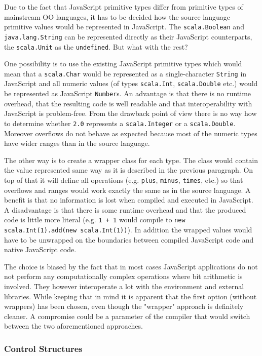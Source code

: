 \documentclass[12pt,a4paper]{report}
\begin{document}
Due to the fact that JavaScript primitive types differ from primitive types of mainstream OO languages, it has to be decided how the source language primitive values  would be represented in JavaScript. The \texttt{scala.Boolean} and \texttt{java.lang.String} can be represented directly as their JavaScript counterparts, the \texttt{scala.Unit} as the \texttt{undefined}. But what with the rest? 

One possibility is to use the existing JavaScript primitive types which would mean that a \texttt{scala.Char} would be represented as a single-character \texttt{String} in JavaScript and all numeric values (of types \texttt{scala.Int}, \texttt{scala.Double} etc.) would be represented as JavaScript \texttt{Number}s. An advantage is that there is no runtime overhead, that the resulting code is well readable and that interoperability with JavaScript is problem-free. From the drawback point of view there is no way how to determine whether \texttt{2.0} represents a \texttt{scala.Integer} or a \texttt{scala.Double}. Moreover overflows do not behave as expected because most of the numeric types have wider ranges than in the source language.

The other way is to create a wrapper class for each type. The class would contain the value represented same way as it is described in the previous paragraph. On top of that it will define all operations (e.g. \texttt{plus}, \texttt{minus}, \texttt{times}, etc.) so that overflows and ranges would work exactly the same as in the source language. A benefit is that no information is lost when compiled and executed in JavaScript. A disadvantage is that there is some runtime overhead and that the produced code is little more literal (e.g. \texttt{1 + 1} would compile to \texttt{new scala.Int(1).add(new scala.Int(1))}). In addition the wrapped values would have to be unwrapped on the boundaries between compiled JavaScript code and native JavaScript code. 

The choice is biased by the fact that in most cases JavaScript applications do not not perform any computationally complex operations where bit arithmetic is involved. They however interoperate a lot with the environment and external libraries. While keeping that in mind it is apparent that the first option (without wrappers) has been chosen, even though the "wrapper" approach is definitely cleaner. A compromise could be a parameter of the compiler that would switch between the two aforementioned approaches.

\subsubsection*{Control Structures}
\end{document}
